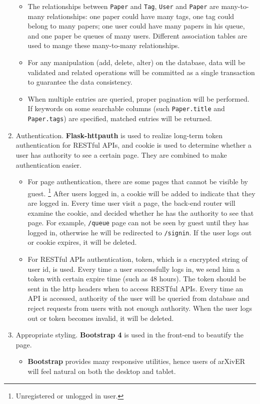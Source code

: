 \documentclass[letterpaper,12pt]{article}
\begin{document}
\begin{enumerate}[label=\alph*)]
\begin{itemize}
                \item The relationships between \texttt{Paper} and \texttt{Tag}, \texttt{User} and \texttt{Paper} are many-to-many relationships: one paper could have many tags, one tag could belong to many papers; one user could have many papers in his queue, and one paper be queues of many users. Different association tables are used to mange these many-to-many relationships.
                
                \item For any manipulation (add, delete, alter) on the database, data will be validated and related operations will be committed as a single transaction to guarantee the data consistency.
                
                \item When multiple entries are queried, proper pagination will be performed. If keywords on some searchable columns (such \texttt{Paper.title} and \texttt{Paper.tags}) are specified, matched entries will be returned.
            \end{itemize}
        \item Authentication. \textbf{Flask-httpauth} is used to realize long-term token authentication for RESTful APIs, and cookie is used to determine whether a user has authority to see a certain page. They are combined to make authentication easier.
            \begin{itemize}
                \item For page authentication, there are some pages that cannot be visible by guest. \footnote{Unregistered or unlogged in user.} After users logged in, a cookie will be added to indicate that they are logged in. Every time user visit a page, the back-end router will examine the cookie, and decided whether he has the authority to see that page. For example, \texttt{/queue} page can not be seen by guest until they has logged in, otherwise he will be redirected to \texttt{/signin}. If the user logs out or cookie expires, it will be deleted.
                \item For RESTful APIs authentication, token, which is a encrypted string of user id, is used. Every time a user successfully logs in, we send him a token with certain expire time (such as 48 hours). The token should be sent in the http headers when to access RESTful APIs. Every time an API is accessed, authority of the user will be queried from database and reject requests from users with not enough authority.
                When the user logs out or token becomes invalid, it will be deleted.
            \end{itemize}
        \item Appropriate styling.\label{styling} \textbf{Bootstrap 4} is used in the front-end to beautify the page. 
            \begin{itemize}
                \item \textbf{Bootstrap} provides many responsive utilities, hence users of arXivER will feel natural on both the desktop and tablet.
                

\end{itemize}
\end{enumerate}
\end{document}
